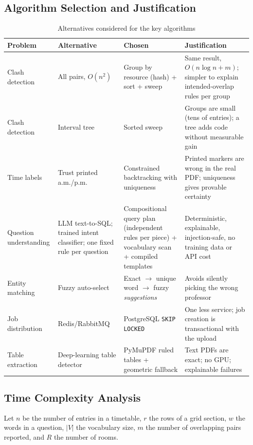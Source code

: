 \subsection{Algorithm Selection and Justification}
\begin{table}[H]
\centering
\caption{Alternatives considered for the key algorithms}
\label{tab:algsel}
\small
\begin{tabularx}{\textwidth}{@{}p{2.8cm}XXp{3cm}@{}}
\toprule
\textbf{Problem} & \textbf{Alternative} & \textbf{Chosen} & \textbf{Justification}\\
\midrule
Clash detection & All pairs, $O(n^2)$ & Group by resource (hash) + sort + sweep & Same result, $O(n\log n + m)$; simpler to explain intended-overlap rules per group\\
Clash detection & Interval tree & Sorted sweep & Groups are small (tens of entries); a tree adds code without measurable gain\\
Time labels & Trust printed a.m./p.m.\ & Constrained backtracking with uniqueness & Printed markers are wrong in the real PDF; uniqueness gives provable certainty\\
Question understanding & LLM text-to-SQL; trained intent classifier; one fixed rule per question & Compositional query plan (independent rules per piece) + vocabulary scan + compiled templates & Deterministic, explainable, injection-safe, no training data or API cost~\cite{androutsopoulos1995,pedro2023}\\
Entity matching & Fuzzy auto-select & Exact $\rightarrow$ unique word $\rightarrow$ fuzzy \emph{suggestions} & Avoids silently picking the wrong professor\\
Job distribution & Redis/RabbitMQ & PostgreSQL \texttt{SKIP LOCKED} & One less service; job creation is transactional with the upload\\
Table extraction & Deep-learning table detector & PyMuPDF ruled tables + geometric fallback & Text PDFs are exact; no GPU; explainable failures\\
\bottomrule
\end{tabularx}
\end{table}

\subsection{Time Complexity Analysis}
Let $n$ be the number of entries in a timetable, $r$ the rows of a grid section, $w$ the words in a
question, $|V|$ the vocabulary size, $m$ the number of overlapping pairs reported, and $R$ the number of rooms.

